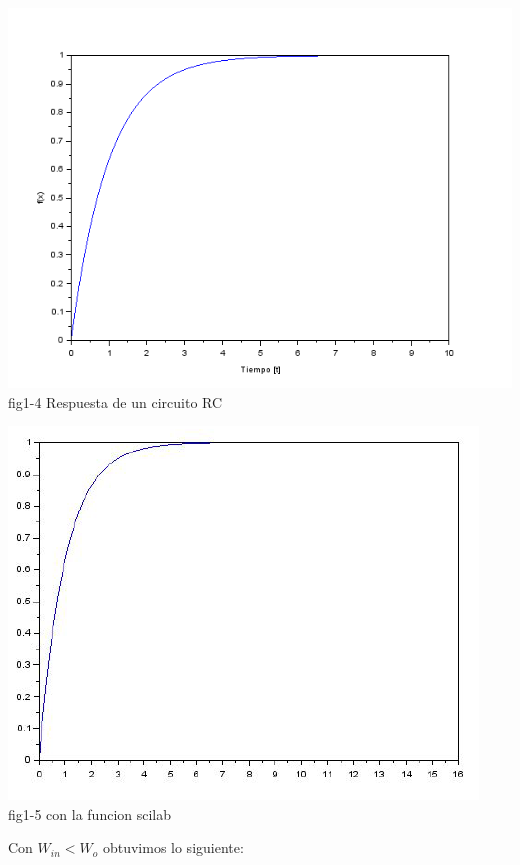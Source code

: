 \documentclass[12pt,a4paper]{IEEEtran}
\begin{document}
\begin{center}
	\includegraphics[scale = 0.4]{images/GRAF}\\
	{fig1-4 Respuesta de un circuito RC}
\end{center}

\begin{center}
	\includegraphics[scale = 0.6]{images/funcionscilab}\\
	{fig1-5 con la funcion scilab}
\end{center}

Con $W_{in}<W_{o}$ obtuvimos lo siguiente:
\end{document}
